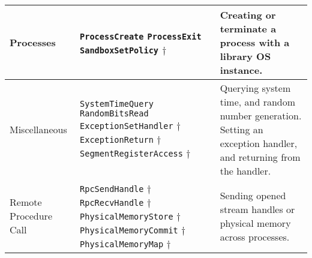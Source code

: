 \begin{tabular}{|p{}|p{}|p{}|}
\\
\hline
\raggedright
Processes & 
\raggedright
{\tt ProcessCreate} \newline
{\tt ProcessExit} \newline
{\tt SandboxSetPolicy} $\dagger$
& 
Creating or terminate a process with a library OS instance.
\\
\hline
\raggedright
Mis\-cel\-la\-ne\-ous & 
\raggedright
{\tt SystemTimeQuery} \newline
{\tt RandomBitsRead} \newline
{\tt ExceptionSetHandler} $\dagger$ \newline
{\tt ExceptionReturn} $\dagger$ \newline
{\tt SegmentRegisterAccess} $\dagger$
& 
Querying system time, and random number generation.
Setting an exception handler, and returning from the handler.
\\
\hline
\raggedright
Remote Procedure Call & 
\raggedright
{\tt RpcSendHandle} $\dagger$ \newline
{\tt RpcRecvHandle} $\dagger$ \newline
{\tt PhysicalMemoryStore} $\dagger$ \newline
{\tt PhysicalMemoryCommit} $\dagger$ \newline
{\tt PhysicalMemoryMap} $\dagger$
& 
Sending opened stream handles or physical memory across processes.
\\
\hline
\end{tabular}